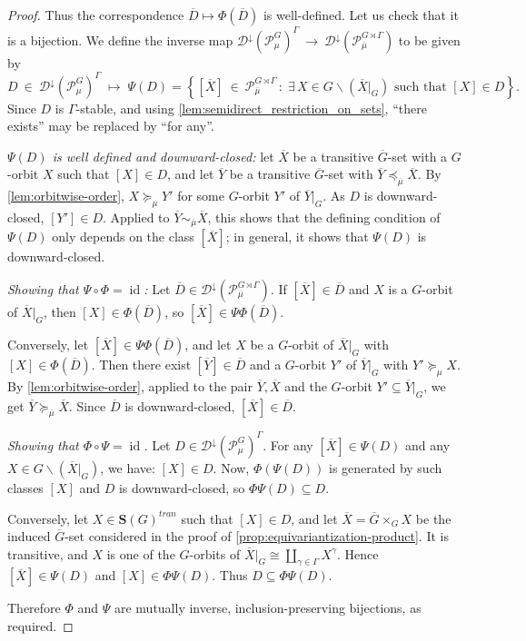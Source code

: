 \documentclass[11pt,a4paper]{amsart}
\theoremstyle{plain}%
\theoremstyle{definition}
\theoremstyle{remark}
\newcommand{\id}{\operatorname{id}}
\newcommand{\Down}{\mathcal{D}^{\downarrow}}
\newcommand{\Set}[1]{\mathbf{S}(#1)}
\newcommand{\oG}{{\overline{G}}}
\newcommand{\oX}{{\overline{X}}}
\begin{document}
\begin{proof}
Thus the correspondence $\overline{D}\mapsto \Phi(\overline{D})$ is well-defined. Let us check that it is a bijection. We define the inverse map $\Down(\mathcal{P}^G_\mu)^{\Gamma} ~\xrightarrow{}~ \Down(\mathcal{P}^{G\rtimes \Gamma}_{\overline{\mu}})$ to be given by 
$$ D~\in ~\Down(\mathcal{P}^G_\mu)^{\Gamma}\; \longmapsto \; \Psi(D)=\left\{[\overline{X}]~\in~ \mathcal{P}^{G\rtimes \Gamma}_{\overline{\mu}}\,:\; \exists \, X\in G\backslash (\overline{X}\rvert_G) \text{ such that }  [X]\in D   \right\}.$$
Since $D$ is $\Gamma$-stable, and using \cref{lem:semidirect_restriction_on_sets}, ``there exists'' may be replaced by ``for any''.

\emph{$\Psi(D)$ is well defined and downward-closed:} let $\oX$ be a transitive $\oG$-set with a $G$-orbit $X$ such that $[X]\in D$, and let $\overline Y$ be a transitive $\oG$-set with $\overline Y\preceq_{\overline\mu}\oX$. By \cref{lem:orbitwise-order}, $X\succeq_\mu Y'$ for some $G$-orbit $Y'$ of $\overline Y|_G$. As $D$ is downward-closed, $[Y']\in D$. Applied to $\overline Y\sim_{\overline\mu}\oX$, this shows that the defining condition of $\Psi(D)$ only depends on the class $[\oX]$; in general, it shows that $\Psi(D)$ is downward-closed. 

\emph{Showing that $\Psi\circ\Phi=\id$:} Let $\overline D\in\Down(\mathcal{P}^{G\rtimes \Gamma}_{\overline{\mu}})$. If $[\oX]\in\overline D$ and $X$ is a $G$-orbit of $\oX|_G$, then $[X]\in \Phi(\overline D)$, so $[\oX]\in\Psi\Phi(\overline D)$. 

Conversely, let $[\oX]\in\Psi\Phi(\overline D)$, and let $X$ be a $G$-orbit of $\oX|_G$ with $[X]\in\Phi(\overline D)$. Then there exist $[\overline Y]\in\overline D$ and a $G$-orbit $Y'$ of $\overline Y|_G$ with $Y'\succeq_\mu X$. By \cref{lem:orbitwise-order}, applied to the pair $\overline Y,\oX$ and the $G$-orbit $Y'\subseteq\overline{Y}|_G$, we get $\overline Y\succeq_{\overline\mu}\oX$. Since $\overline D$ is downward-closed, $[\oX]\in\overline D$.

\emph{Showing that $\Phi\circ\Psi=\id$.} Let $D\in\Down(\mathcal{P}^G_\mu)^\Gamma$. For any $[\oX]\in\Psi(D)$ and any $X\in G\backslash(\oX|_G)$, we have: $ [X]\in D$. Now, $\Phi(\Psi(D))$ is generated by such classes $[X]$ and $D$ is downward-closed, so $\Phi\Psi(D)\subseteq D$. 

Conversely, let $X\in \Set{G}^{tran}$ such that $[X]\in D$, and let $\oX=\oG\times_G X$ be the induced $\oG$-set considered in the proof of \cref{prop:equivariantization-product}. It is transitive, and $X$ is one of the $G$-orbits of $\oX|_G\cong\coprod_{\gamma\in\Gamma}X^\gamma$. Hence $[\oX]\in\Psi(D)$ and $[X]\in \Phi\Psi(D)$. Thus $D\subseteq \Phi\Psi(D)$.

Therefore $\Phi$ and $\Psi$ are mutually inverse, inclusion-preserving bijections, as required.

\end{proof}
\end{document}
